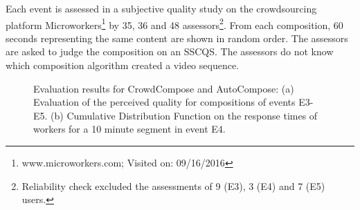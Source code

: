 Each event is assessed in a subjective quality study on the crowdsourcing platform Microworkers\footnote{www.microworkers.com; Visited on: 09/16/2016} by 35, 36 and 48 assessors\footnote{Reliability check excluded the assessments of 9 (E3), 3 (E4) and 7 (E5) users.}. 
From each composition, 60 seconds representing the same content are shown in random order.
The assessors are asked to judge the composition on an \ac{SSCQS}. 
The assessors do not know which composition algorithm created a video sequence.

\begin{figure}[!htb]
	\centering
	\caption[Evaluation results for CrowdCompose and AutoCompose]{Evaluation results for CrowdCompose and AutoCompose: (a) Evaluation of the perceived quality for compositions of events E3-E5. (b) Cumulative Distribution Function on the response times of workers for a 10 minute segment in event E4.}
	\label{fig:690_MOS}
\end{figure}
